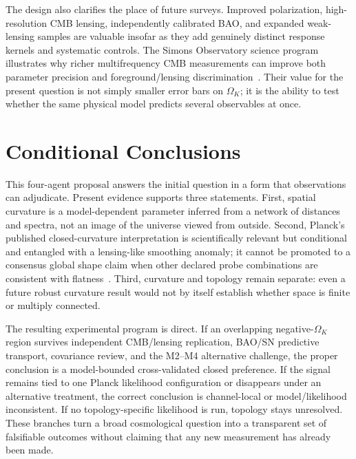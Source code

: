 \documentclass[conference]{IEEEtran}
\newcommand{\ok}{\ensuremath{\Omega_K}}
\begin{document}
The design also clarifies the place of future surveys. Improved polarization, high-resolution CMB lensing, independently calibrated BAO, and expanded weak-lensing samples are valuable insofar as they add genuinely distinct response kernels and systematic controls. The Simons Observatory science program illustrates why richer multifrequency CMB measurements can improve both parameter precision and foreground/lensing discrimination~\cite{simons19}. Their value for the present question is not simply smaller error bars on $\ok$; it is the ability to test whether the same physical model predicts several observables at once.

\section{Conditional Conclusions}

This four-agent proposal answers the initial question in a form that observations can adjudicate. Present evidence supports three statements. First, spatial curvature is a model-dependent parameter inferred from a network of distances and spectra, not an image of the universe viewed from outside. Second, Planck's published closed-curvature interpretation is scientifically relevant but conditional and entangled with a lensing-like smoothing anomaly; it cannot be promoted to a consensus global shape claim when other declared probe combinations are consistent with flatness~\cite{planck18,act25,eboss21}. Third, curvature and topology remain separate: even a future robust curvature result would not by itself establish whether space is finite or multiply connected.

The resulting experimental program is direct. If an overlapping negative-$\ok$ region survives independent CMB/lensing replication, BAO/SN predictive transport, covariance review, and the M2--M4 alternative challenge, the proper conclusion is a model-bounded cross-validated closed preference. If the signal remains tied to one Planck likelihood configuration or disappears under an alternative treatment, the correct conclusion is channel-local or model/likelihood inconsistent. If no topology-specific likelihood is run, topology stays unresolved. These branches turn a broad cosmological question into a transparent set of falsifiable outcomes without claiming that any new measurement has already been made.
\end{document}
